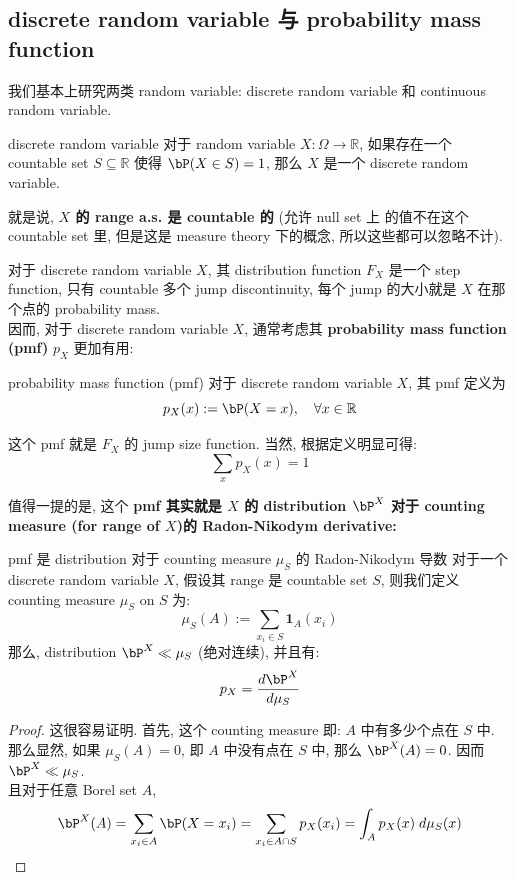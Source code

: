 \subsection{discrete  random variable 与 probability mass function}
我们基本上研究两类 random variable: discrete random variable 和 continuous random variable.
\begin{definition}{discrete random variable}\label{discrete-rv}
    对于 random variable \(X: \Omega \to \mathbb{R}\),
     如果存在一个 countable set \(S \subseteq \mathbb{R}\) 
     使得 \(\bP(X \in S) = 1\), 
     那么 \(X\) 是一个 discrete random variable.
\end{definition}
\begin{remark}
    就是说, \textbf{\(X\) 的 range a.s. 是 countable 的} (允许 null set 上
    的值不在这个 countable set 里, 但是这是 measure theory 
    下的概念, 所以这些都可以忽略不计). 
\end{remark}
\begin{remark}
    对于 discrete random variable \(X\), 
    其 distribution function \(F_X\) 是一个 step function, 
    只有 countable 多个 jump discontinuity, 
    每个 jump 的大小就是 \(X\) 在那个点的 probability mass.\\
    因而, 对于 discrete random variable \(X\), 
    通常考虑其 \textbf{probability mass function (pmf)} \(p_X\) 更加有用:
    \begin{definition}{probability mass function (pmf)}
        对于 discrete random variable \(X\), 其 pmf 定义为
        \[
        p_X(x) := \bP(X = x), \quad \forall x \in \mathbb{R}
        \]
    \end{definition}
这个 pmf 就是 \(F_X\) 的 jump size function.
当然, 根据定义明显可得: \[
\sum_{x} p_X(x) = 1
\]
\end{remark}
 值得一提的是, 
    这个 \textbf{pmf 其实就是 \(X\) 的 distribution \(\bP^X\) 对于 counting measure (for range of \(X\))的 Radon-Nikodym derivative:}

\begin{proposition}{pmf 是 distribution 对于 counting measure \(\mu_S\) 的 Radon-Nikodym 导数}
对于一个 discrete random variable \(X\), 假设其 range 是 countable set \(S\), 
则我们定义 counting measure \(\mu_S\) on \(S\) 为: \[
\mu_S(A) := \sum_{x_i \in S} \mathbf{1}_A(x_i)
\]
那么, distribution \(\bP^X \ll \mu_S\) (绝对连续), 并且有:
     \[
     p_X = \frac{d\bP^X}{d\mu_{S}}
     \]
\end{proposition}
\begin{proof}
    这很容易证明. 首先, 这个 counting measure 即:
    \(A\) 中有多少个点在 \(S\) 中.\\
    那么显然, 如果 \(\mu_S(A) = 0\), 即 \(A\) 中没有点在 \(S\) 中, 
    那么 \(\bP^X(A) = 0\). 因而 \(\bP^X \ll \mu_S\).\\
    且对于任意 Borel set \(A\),
    \[
    \bP^X(A) = \sum_{x_i \in A} \bP(X = x_i) = \sum_{x_i \in A\cap S} p_X(x_i) = \int_A p_X(x) \;d\mu_{S}(x)
     \]  
\end{proof}

